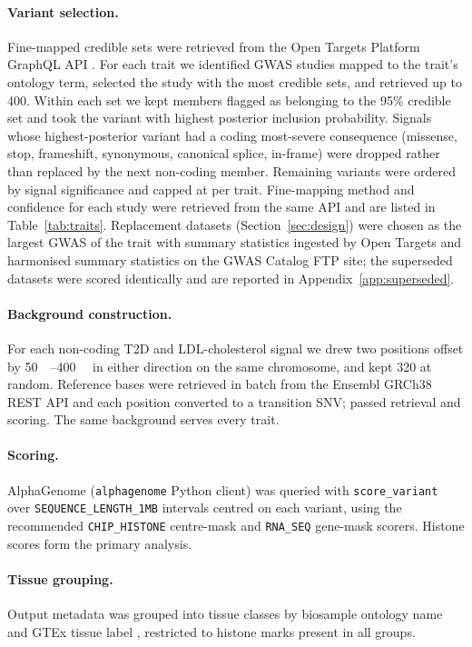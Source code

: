 \documentclass[11pt]{article}
\begin{document}
\paragraph{Variant selection.} Fine-mapped credible sets were retrieved from the Open
Targets Platform GraphQL API \citep{buniello2025opentargets}. For each trait we
identified GWAS studies mapped to the trait's ontology term, selected the study with the
most credible sets, and retrieved up to 400. Within each set we kept members flagged as
belonging to the 95\% credible set and took the variant with highest posterior inclusion
probability. Signals whose highest-posterior variant had a coding most-severe consequence (missense,
stop, frameshift, synonymous, canonical splice, in-frame) were dropped rather than
replaced by the next non-coding member. Remaining variants were ordered by signal
significance and capped at \NCAP{} per trait. Fine-mapping method and confidence for each
study were retrieved from the same API and are listed in Table~\ref{tab:traits}.
Replacement datasets (Section~\ref{sec:design}) were chosen as the largest GWAS of the
trait with summary statistics ingested by Open Targets and harmonised summary statistics
on the GWAS Catalog FTP site; the superseded datasets were scored identically and are
reported in Appendix~\ref{app:superseded}.

\paragraph{Background construction.} For each non-coding T2D and LDL-cholesterol signal
we drew two positions offset by \SIrange{50}{400}{\kilo\bp} in either direction on the
same chromosome, and kept 320 at random. Reference bases were retrieved in batch from the
Ensembl GRCh38 REST API and each position converted to a transition SNV; \NBG{} passed
retrieval and scoring. The same background serves every trait.

\paragraph{Scoring.} AlphaGenome (\texttt{alphagenome} Python client) was queried with
\texttt{score\_variant} over \texttt{SEQUENCE\_LENGTH\_1MB} intervals centred on each
variant, using the recommended \texttt{CHIP\_HISTONE} centre-mask and \texttt{RNA\_SEQ}
gene-mask scorers. Histone scores form the primary analysis.

\paragraph{Tissue grouping.} Output metadata was grouped into \NTISSUE{} tissue classes
by biosample ontology name and GTEx tissue label \citep{gtex2020, encode2020}, restricted
to histone marks present in all groups.
\end{document}
